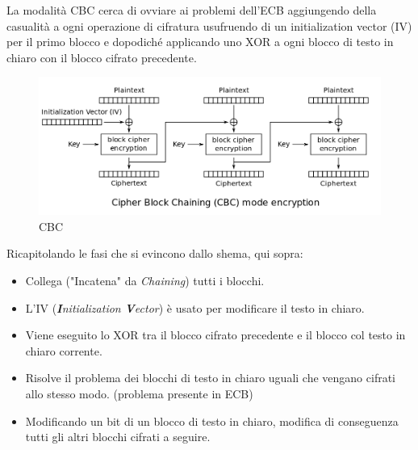    

\textsf{\small La modalità CBC cerca di ovviare ai problemi dell'ECB aggiungendo della casualità a ogni operazione di cifratura usufruendo di un initialization vector (IV) per il primo blocco e dopodiché applicando uno XOR a ogni blocco di testo in chiaro con il blocco cifrato precedente.} %

\begin{figure}[H]
	\centering
	\includegraphics[width=1\textwidth, height=1\textheight, keepaspectratio]{./images/aes_modes/cbc.png} %
	\caption{CBC}
	\label{fig:cbc}
\end{figure}

\textsf{\small Ricapitolando le fasi che si evincono dallo shema, qui sopra:}

  

\begin{itemize}
	\item \textsf{\small Collega ("Incatena" da \emph{Chaining}) tutti i blocchi.}
	\item \textsf{\small L'IV (\emph{\textbf{I}nitialization \textbf{V}ector}) è usato per modificare il testo in chiaro.}
	\item \textsf{\small Viene eseguito lo XOR tra il blocco cifrato precedente e il blocco col testo in chiaro corrente.}
	\item \textsf{\small Risolve il problema dei blocchi di testo in chiaro uguali che vengano cifrati allo stesso modo. (problema presente in ECB)}
	\item \textsf{\small Modificando un bit di un blocco di testo in chiaro, modifica di conseguenza tutti gli altri blocchi cifrati a seguire.}
\end{itemize}



